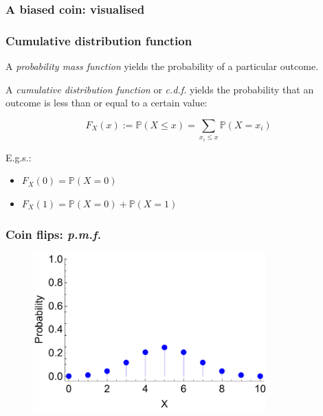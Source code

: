 \documentclass{beamer}
\begin{document}
	\begin{frame}
		\frametitle{A biased coin: visualised}
		
		\begin{figure}[t]
			\centerline{}
		\end{figure}
			
	\end{frame}
	
	\begin{frame}
		\frametitle{Cumulative distribution function}
		
		A \textit{probability mass function} yields the probability of a particular outcome.
		
		\vspace{0.5cm}
		
		A \textit{cumulative distribution function} or \textit{c.d.f.} yields the probability that an outcome is less than or equal to a certain value:
		
		\begin{equation}
		F_X(x) := \mathbb{P}(X\leq x) = \sum_{x_i \leq x} \mathbb{P}(X = x_i)
		\end{equation}
		
		E.g.s.:
		
		\begin{itemize}
			\item $F_X(0) = \mathbb{P}(X=0)$
			\item $F_X(1) = \mathbb{P}(X=0) + \mathbb{P}(X=1)$
		\end{itemize}
		
	\end{frame}
	
	\begin{frame}
		\frametitle{Coin flips: \textit{p.m.f.}}
		
		\begin{figure}[ht]
			\includegraphics[width=0.8\textwidth]{./figures/binomial_cdf_1.pdf}
		\end{figure}
		
	\end{frame}
	
\end{document}
